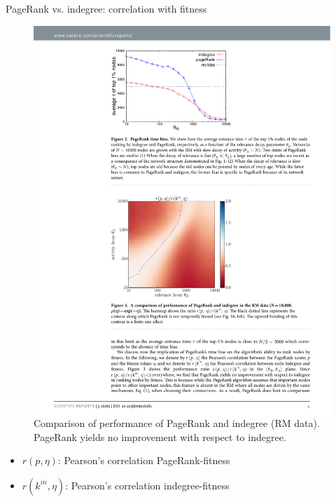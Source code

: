 \documentclass[utf8]{beamer}
\begin{document}
\begin{frame}{PageRank vs. indegree: correlation with fitness}
    \begin{figure}
        \begin{columns}

            \includegraphics[width=1.0\textwidth]{figures/PageRankRM_heatmap}

            \caption{Comparison of performance of PageRank and indegree (RM data). \newline
            PageRank yields no improvement with respect to indegree.}
        \end{columns}
    \end{figure}
    \begin{itemize}
        \item $r(p, \eta)$: Pearson's correlation PageRank-fitness
        \item $r(k^{in}, \eta)$: Pearson's correlation indegree-fitness
    \end{itemize}
\end{frame}
\end{document}
